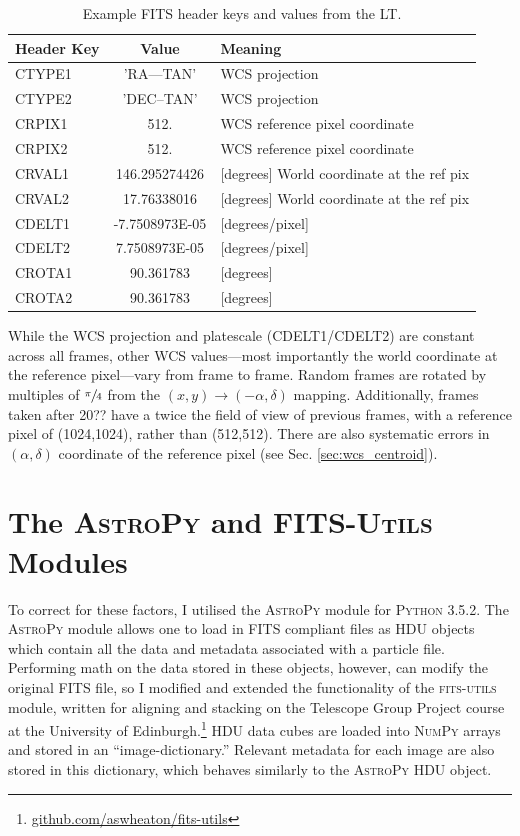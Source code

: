 \documentclass[a4paper,11pt]{article}
\begin{document}
\begin{table}[h!]
    \centering
    \begin{tabular}{ | l | c | l |} \hline
        Header Key & Value & Meaning \\ \hline \hline
        CTYPE1  & 'RA---TAN'     & WCS projection \\
        CTYPE2  & 'DEC--TAN'     & WCS projection \\
        CRPIX1  &  512.          & WCS reference pixel coordinate \\
        CRPIX2  &  512.          & WCS reference pixel coordinate \\
        CRVAL1  &  146.295274426 & [degrees] World coordinate at the ref pix \\
        CRVAL2  &  17.76338016   & [degrees] World coordinate at the ref pix \\
        CDELT1  & -7.7508973E-05 & [degrees/pixel] \\
        CDELT2  & 7.7508973E-05  & [degrees/pixel] \\
        CROTA1  & 90.361783      & [degrees] \\
        CROTA2  & 90.361783      & [degrees] \\ \hline
    \end{tabular}
    \caption{\label{tab:FITS_header}Example FITS header keys and values from the LT.}
\end{table}

While the WCS projection and platescale (CDELT1/CDELT2) are constant across all frames, other WCS values---most importantly the world coordinate at the reference pixel---vary from frame to frame. Random frames are rotated by multiples of $\sfrac{\pi}{4}$ from the $(x,y) \rightarrow (-\alpha, \delta)$ mapping. Additionally, frames taken after 20?? have a twice the field of view of previous frames, with a reference pixel of (1024,1024), rather than (512,512). There are also systematic errors in $(\alpha, \delta)$ coordinate of the reference pixel (see Sec. \ref{sec:wcs_centroid}).

\section{The \textsc{AstroPy} and \textsc{FITS-Utils} Modules}

To correct for these factors, I utilised the \textsc{AstroPy} module for \textsc{Python 3.5.2}. The \textsc{AstroPy} module allows one to load in FITS compliant files as HDU objects which contain all the data and metadata associated with a particle file. Performing math on the data stored in these objects, however, can modify the original FITS file\cite{astropy_2013}\cite{astropy_2018}, so I modified and extended the functionality of the \textsc{fits-utils} module, written for aligning and stacking on the Telescope Group Project course at the University of Edinburgh.\footnote{\url{github.com/aswheaton/fits-utils}} HDU data cubes are loaded into \textsc{NumPy} arrays and stored in an ``image-dictionary.'' Relevant metadata for each image are also stored in this dictionary, which behaves similarly to the \textsc{AstroPy} HDU object.
\end{document}
